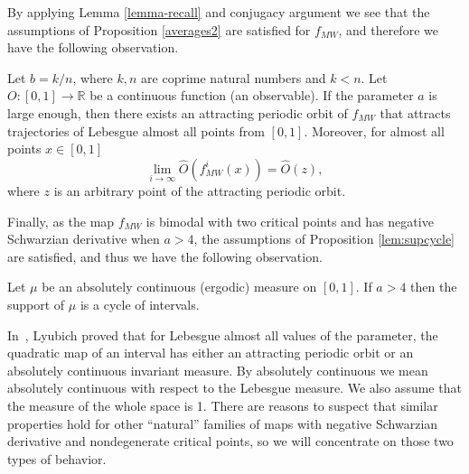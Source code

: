 \documentclass[format=acmsmall, authorversion, screen=true]{acmart}
\def\R{\ensuremath{\mathbb{R}}}
\begin{document}
By applying Lemma \ref{lemma-recall} and conjugacy argument we see that the assumptions of Proposition \ref{averages2} are satisfied for $f_{MW}$, and therefore we have the following observation.

\begin{corollary}
Let $b = k/n$, where $k,n$ are coprime natural numbers and $k<n$.
Let $O\colon [0,1]\to\R$ be a continuous function (an observable). If the parameter $a$ is large enough, then there exists an attracting periodic orbit of $f_{MW}$ that attracts trajectories of Lebesgue almost all points from $[0,1]$. Moreover, for almost all points $x \in [0,1]$
\[
\lim_{i\rightarrow \infty} \hat{O}(f_{MW}^i(x)) = \hat{O}(z),
\]
where $z$ is an arbitrary point of the attracting periodic orbit.
\end{corollary}

Finally, as the map $f_{MW}$ is bimodal with two critical points and has negative Schwarzian derivative when $a>4$, the assumptions of Proposition \ref{lem:supcycle} are satisfied, and thus we have the following observation.

\begin{corollary}
Let $\mu$ be an absolutely continuous (ergodic) measure on $[0,1]$. If $a>4$ then the support of $\mu$ is a cycle of intervals.
\end{corollary}

In~\cite{lyubich2002}, Lyubich proved that for Lebesgue almost all
values of the parameter, the quadratic map of an interval has either
an attracting periodic orbit or an absolutely continuous invariant
measure. By absolutely continuous we mean absolutely continuous with
respect to the Lebesgue measure. We also assume that the measure of
the whole space is 1. There are reasons \cite{bruin2010lebesgue,blokh1990decomposition} to suspect that similar
properties hold for other ``natural'' families of maps with negative
Schwarzian derivative and nondegenerate critical points, so we will
concentrate on those two types of behavior.
\end{document}
